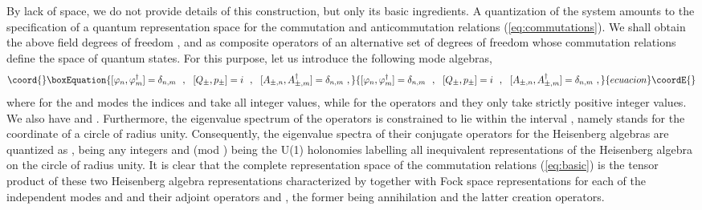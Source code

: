 \documentclass[a4paper,11pt]{article}
\def\Z{\mathbb Z}
\begin{document}
By lack of space, we do not provide details of this construction,
but only its basic ingredients.\cite{Gaby} A quantization of
the system amounts to the specification of a quantum representation space
for the commutation and anticommutation relations (\ref{eq:commutations}).
We shall obtain the above field degrees of freedom \coordHE{}, \coordHE{}
and \coordHE{} as composite operators of an alternative set
of degrees of freedom whose commutation relations define the space of
quantum states. For this purpose, let us introduce the following
mode algebras,
\begin{equation}\coord{}\boxEquation{
[\varphi_n,\varphi^\dagger_m]=\delta_{n,m}\ \ ,\ \ 
[Q_\pm,p_\pm]=i\ \ ,\ \ 
[A_{\pm,n},A^\dagger_{\pm,m}]=\delta_{n,m}\ ,
\label{eq:basic}
}{
[\varphi_n,\varphi^\dagger_m]=\delta_{n,m}\ \ ,\ \ 
[Q_\pm,p_\pm]=i\ \ ,\ \ 
[A_{\pm,n},A^\dagger_{\pm,m}]=\delta_{n,m}\ ,
}{ecuacion}\coordE{}\end{equation}
where for the \myHighlight{$\varphi_n$}\coordHE{} and \coordHE{} modes the indices
\myHighlight{$n$}\coordHE{} and \coordHE{} take all integer values, while for the operators
\myHighlight{$A_{\pm,n}$}\coordHE{} and \coordHE{} they only take strictly
positive integer values. We also have \coordHE{} and
\myHighlight{$p^\dagger_\pm=p_\pm$}\coordHE{}. Furthermore, the eigenvalue spectrum of the
\myHighlight{$Q_\pm$}\coordHE{} operators is constrained to lie within the interval \myHighlight{$[0,2\pi]$}\coordHE{},
namely \myHighlight{$Q_\pm$}\coordHE{} stands for the coordinate of a circle of radius unity.
Consequently, the eigenvalue spectra of their conjugate operators \myHighlight{$p_\pm$}\coordHE{}
for the Heisenberg algebras \myHighlight{$[Q_\pm,p_\pm]=i$}\coordHE{} are quantized as
\myHighlight{$(n_\pm+\lambda_\pm)$}\coordHE{}, \myHighlight{$n_\pm$}\coordHE{} being any integers and 
\myHighlight{$\lambda_\pm$}\coordHE{} (mod \myHighlight{$\Z$}\coordHE{}) being the U(1) holonomies labelling all inequivalent
representations of the Heisenberg algebra on the circle of radius 
unity.\cite{Gov6} It is clear that the complete representation space of 
the commutation
relations (\ref{eq:basic}) is the tensor product of these two Heisenberg 
algebra representations characterized by \myHighlight{$\lambda_\pm$}\coordHE{} together with Fock 
space representations for each of the independent modes \coordHE{} and 
\coordHE{} and their adjoint operators \coordHE{} and
\myHighlight{$A^\dagger_{\pm,n}$}\coordHE{}, the former being annihilation and the latter 
creation operators.
\end{document}
